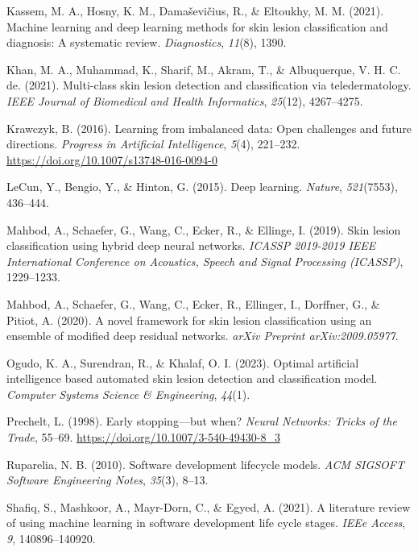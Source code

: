 \documentclass[
  12pt,
  oneside]{article}
\newlength{\cslhangindent}
\newenvironment{CSLReferences}[2] %
 {\begin{list}{}{%
  \setlength{\itemindent}{0pt}
  \setlength{\leftmargin}{0pt}
  \setlength{\parsep}{0pt}
  \ifodd #1
   \setlength{\leftmargin}{\cslhangindent}
   \setlength{\itemindent}{-1\cslhangindent}
  \fi
  \setlength{\itemsep}{#2\baselineskip}}}
 {\end{list}}
\begin{document}
\begin{CSLReferences}{1}{0}
Kassem, M. A., Hosny, K. M., Damaševičius, R., \& Eltoukhy, M. M.
(2021). Machine learning and deep learning methods for skin lesion
classification and diagnosis: A systematic review. \emph{Diagnostics},
\emph{11}(8), 1390.

Khan, M. A., Muhammad, K., Sharif, M., Akram, T., \& Albuquerque, V. H.
C. de. (2021). Multi-class skin lesion detection and classification via
teledermatology. \emph{IEEE Journal of Biomedical and Health
Informatics}, \emph{25}(12), 4267--4275.

Krawczyk, B. (2016). Learning from imbalanced data: Open challenges and
future directions. \emph{Progress in Artificial Intelligence},
\emph{5}(4), 221--232. \url{https://doi.org/10.1007/s13748-016-0094-0}

LeCun, Y., Bengio, Y., \& Hinton, G. (2015). Deep learning.
\emph{Nature}, \emph{521}(7553), 436--444.

Mahbod, A., Schaefer, G., Wang, C., Ecker, R., \& Ellinge, I. (2019).
Skin lesion classification using hybrid deep neural networks.
\emph{ICASSP 2019-2019 IEEE International Conference on Acoustics,
Speech and Signal Processing (ICASSP)}, 1229--1233.

Mahbod, A., Schaefer, G., Wang, C., Ecker, R., Ellinger, I., Dorffner,
G., \& Pitiot, A. (2020). A novel framework for skin lesion
classification using an ensemble of modified deep residual networks.
\emph{arXiv Preprint arXiv:2009.05977}.

Ogudo, K. A., Surendran, R., \& Khalaf, O. I. (2023). Optimal artificial
intelligence based automated skin lesion detection and classification
model. \emph{Computer Systems Science \& Engineering}, \emph{44}(1).

Prechelt, L. (1998). Early stopping---but when? \emph{Neural Networks:
Tricks of the Trade}, 55--69.
\url{https://doi.org/10.1007/3-540-49430-8_3}

Ruparelia, N. B. (2010). Software development lifecycle models.
\emph{ACM SIGSOFT Software Engineering Notes}, \emph{35}(3), 8--13.

Shafiq, S., Mashkoor, A., Mayr-Dorn, C., \& Egyed, A. (2021). A
literature review of using machine learning in software development life
cycle stages. \emph{IEEe Access}, \emph{9}, 140896--140920.


\end{CSLReferences}
\end{document}
